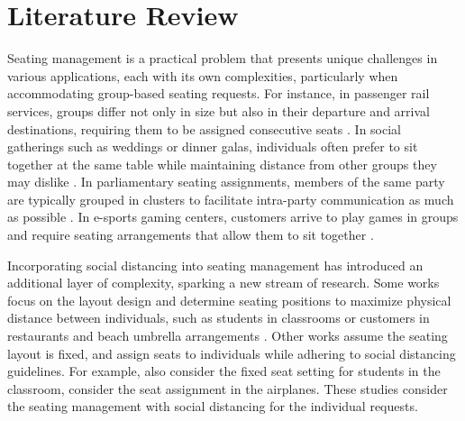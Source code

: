 \section{Literature Review}\label{literature}

Seating management is a practical problem that presents unique challenges in various applications, each with its own complexities, particularly when accommodating group-based seating requests. For instance, in passenger rail services, groups differ not only in size but also in their departure and arrival destinations, requiring them to be assigned consecutive seats \citep{clausen2010off, deplano2019offline}. In social gatherings such as weddings or dinner galas, individuals often prefer to sit together at the same table while maintaining distance from other groups they may dislike \citep{lewis2016creating}. In parliamentary seating assignments, members of the same party are typically grouped in clusters to facilitate intra-party communication as much as possible \citep{vangerven2022parliament}. In e-sports gaming centers, customers arrive to play games in groups and require seating arrangements that allow them to sit together \citep{kwag2022optimal}.

Incorporating social distancing into seating management has introduced an additional layer of complexity, sparking a new stream of research. Some works focus on the layout design and determine seating positions to maximize physical distance between individuals, such as students in classrooms \citep{bortolete2022support} or customers in restaurants and beach umbrella arrangements \citep{fischetti2023safe}. Other works assume the seating layout is fixed, and assign seats to individuals while adhering to social distancing guidelines. For example, \citet{bortolete2022support} also consider the fixed seat setting for students in the classroom, \citet{salari2020social, pavlik2021airplane} consider the seat assignment in the airplanes. These studies consider the seating management with social distancing for the individual requests.


